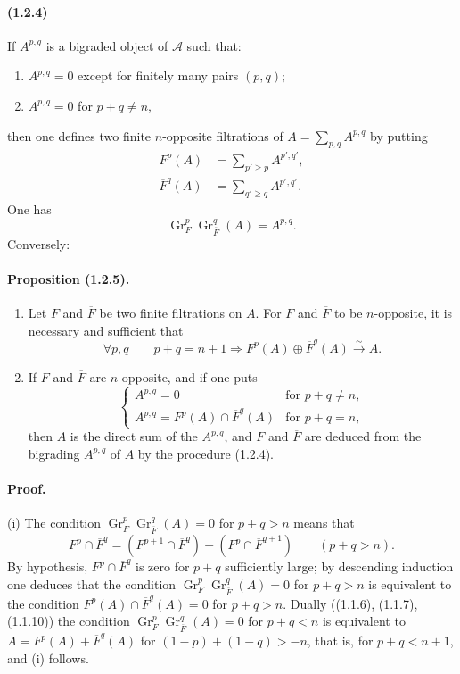 \documentclass[10pt]{article}
\newcommand{\Gr}{\operatorname{Gr}}
\newcommand{\calA}{\mathcal A}
\newcommand{\iso}{\xrightarrow{\sim}}
\begin{document}
\paragraph{(1.2.4)} If $A^{p,q}$ is a bigraded object of $\calA$ such that:
\begin{enumerate}[label=\alph*)]
\item $A^{p,q}=0$ except for finitely many pairs $(p,q)$;
\item $A^{p,q}=0$ for $p+q\ne n$,
\end{enumerate}
then one defines two finite $n$-opposite filtrations of $A=\sum_{p,q}A^{p,q}$ by putting
\begin{align}
F^p(A)&=\sum_{p'\ge p} A^{p',q'}, \tag{1.2.4.1}\\
\overline F^q(A)&=\sum_{q'\ge q} A^{p',q'}. \tag{1.2.4.2}
\end{align}
One has
\[
\tag{1.2.4.3}
\Gr_F^p\Gr_{\overline F}^{q}(A)=A^{p,q}.
\]
Conversely:

\paragraph{Proposition (1.2.5).} \begin{enumerate}[label=(\roman*)]
\item Let $F$ and $\overline F$ be two finite filtrations on $A$. For $F$ and $\overline F$ to be $n$-opposite, it is necessary and sufficient that
\[
\forall p,q\qquad p+q=n+1\Rightarrow F^p(A)\oplus\overline F^q(A)\iso A.
\]
\item If $F$ and $\overline F$ are $n$-opposite, and if one puts
\[
\begin{cases}
A^{p,q}=0 & \text{for }p+q\ne n,\\
A^{p,q}=F^p(A)\cap\overline F^q(A) & \text{for }p+q=n,
\end{cases}
\]
then $A$ is the direct sum of the $A^{p,q}$, and $F$ and $\overline F$ are deduced from the bigrading $A^{p,q}$ of $A$ by the procedure (1.2.4).
\end{enumerate}

\paragraph{Proof.} (i) The condition $\Gr_F^p\Gr_{\overline F}^q(A)=0$ for $p+q>n$ means that
\[
F^p\cap\overline F^q=(F^{p+1}\cap\overline F^q)+(F^p\cap\overline F^{q+1})\qquad(p+q>n).
\]
By hypothesis, $F^p\cap\overline F^q$ is zero for $p+q$ sufficiently large; by descending induction one deduces that the condition $\Gr_F^p\Gr_{\overline F}^q(A)=0$ for $p+q>n$ is equivalent to the condition $F^p(A)\cap\overline F^q(A)=0$ for $p+q>n$. Dually ((1.1.6), (1.1.7), (1.1.10)) the condition $\Gr_F^p\Gr_{\overline F}^q(A)=0$ for $p+q<n$ is equivalent to $A=F^p(A)+\overline F^q(A)$ for $(1-p)+(1-q)>-n$, that is, for $p+q<n+1$, and (i) follows.
\end{document}
